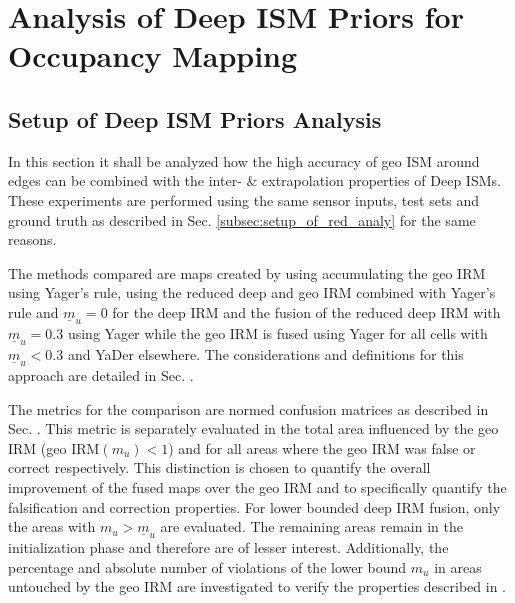 %
\section{Analysis of Deep ISM Priors for Occupancy Mapping}
\label{sec:exp_analyze_prior_properties}
%
\subsection{Setup of Deep ISM Priors Analysis}
\label{subsec:setup_of_prior_analy}
In this section it shall be analyzed how the high accuracy of geo ISM around edges can be combined with the inter- \& extrapolation properties of Deep ISMs. These experiments are performed using the same sensor inputs, test sets and ground truth as described in Sec. \ref{subsec:setup_of_red_analy} for the same reasons. 

The methods compared are maps created by using accumulating the geo IRM using Yager's rule, using the reduced deep and geo IRM combined with Yager's rule and $\underline{m}_u = 0$ for the deep IRM and the fusion of the reduced deep IRM with $\underline{m}_u = 0.3$ using Yager while the geo IRM is fused using Yager for all cells with $\underline{m}_u < 0.3$ and YaDer elsewhere. The considerations and definitions for this approach are detailed in Sec. . 

The metrics for the comparison are normed confusion matrices as described in Sec. . This metric is separately evaluated in the total area influenced by the geo IRM (geo IRM$(m_u) < 1$) and for all areas where the geo IRM was false or correct respectively. This distinction is chosen to quantify the overall improvement of the fused maps over the geo IRM and to specifically quantify the falsification and correction properties. For lower bounded deep IRM fusion, only the areas with $m_u > \underline{m}_u$ are evaluated. The remaining areas remain in the initialization phase and therefore are of lesser interest. Additionally, the percentage and absolute number of violations of the lower bound $m_u$ in areas untouched by the geo IRM are investigated to verify the properties described in .
%
